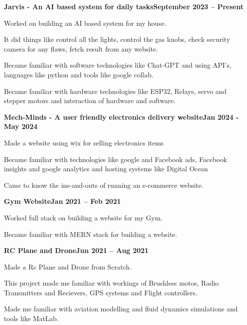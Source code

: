 \documentclass[letterpaper,10pt]{article}
\newcommand{\heading}[2]{
  \hspace{10pt}#1\hfill#2\\
}
\newcommand{\headingBf}[2]{
  \heading{\textbf{#1}}{\textbf{#2}}
}
\newenvironment{resume_list}{
  \vspace{-7pt}
  \begin{itemize}[itemsep=-2px, parsep=1pt, leftmargin=30pt]
}{
  \end{itemize}
}
\begin{document}
   \headingBf{Jarvis - An AI based system for daily tasks}{September 2023 -- Present}
  \begin{resume_list}
    \item Worked on building an AI based system for my house.
    \item It did things like control all the lights, control the gas knobs, check security camera for any flaws, fetch result from any website. 
    \item Became familiar with software technologies like Chat-GPT and using API's, languages like python and tools like google collab. 
    \item Became familiar with hardware technologies like ESP32, Relays, servo and stepper motors and interaction of hardware and software. 
  \end{resume_list}

  
  \headingBf{Mech-Minds - A user friendly electronics delivery website}{Jan 2024 - May 2024}
  \begin{resume_list}
    \item Made a website using wix for selling electronics items
    \item Became familiar with technologies like google and Facebook ads, Facebook insights and google analytics and hosting systems like Digital Ocean
    \item Came to know the ins-and-outs of running an e-commerce website.
  \end{resume_list}

     \headingBf{Gym Website}{Jan 2021 -- Feb 2021}
  \begin{resume_list}
    \item Worked full stack on building a website for my Gym.
    \item Became familiar with MERN stack for building a website. 
  \end{resume_list}

  \headingBf{RC Plane and Drone}{Jun 2021 -- Aug 2021}
  \begin{resume_list}
    \item Made a Rc Plane and Drone from Scratch.
    \item This project made me familiar with workings of Brushless motos, Radio Transmitters and Recievers, GPS systems and Flight controllers.
    \item Made me familiar with aviation modelling and fluid dynamics simulations and tools like MatLab.
  \end{resume_list}
\end{document}
